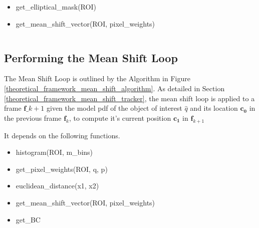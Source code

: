 \begin{itemize}
    \item get\_elliptical\_mask(ROI)
    \item get\_mean\_shift\_vector(ROI, pixel\_weights)
\end{itemize}

\begin{lstlisting}

\end{lstlisting}

\subsection{Performing the Mean Shift Loop}
The Mean Shift Loop is outlined by the Algorithm in
Figure \ref{theoretical_framework_mean_shift_algorithm}. As detailed in
Section \ref{theoretical_framework_mean_shift_tracker}, the mean shift loop is
applied to a frame $\mathbf{f}\_{k+1}$ given the model pdf of the object of
interest $\hat{q}$ and its location $\mathbf{c_0}$ in the previous frame
$\mathbf{f}_{k}$, to compute it's current position $\mathbf{c_1}$ in
$\mathbf{f}_{k+1}$

It depends on the following functions.

\begin{itemize}
    \item histogram(ROI, m\_bins)
    \item get\_pixel\_weights(ROI, q, p)
    \item euclidean\_distance(x1, x2)
    \item get\_mean\_shift\_vector(ROI, pixel\_weights)
    \item get\_BC
\end{itemize}



